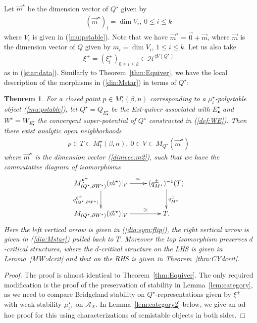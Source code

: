 \documentclass[11pt]{amsart}
\theoremstyle{plain}
\newtheorem{thm}{Theorem}[section]
\theoremstyle{definition}
\theoremstyle{remark}
\newcommand{\aA}{\mathcal{A}}
\newcommand{\hH}{\mathcal{H}}
\begin{document}
Let $\vec{m}^{\star}$ be the dimension vector of $Q^{\star}$ given by
\begin{align}\label{dimvec:m2}
(\vec{m}^{\star})_i=\dim V_i, \ 
0 \le i\le k
\end{align}
where $V_i$ is given in (\ref{mu:pstable}). 
Note that we have $\vec{m}^{\star}=\vec{0}+\vec{m}$, where 
$\vec{m}$ is the dimension vector of $Q$
given by $m_i=\dim V_i$, $1\le i\le k$. 
Let us also 
take 
\begin{align*}
\xi^{\pm} =(\xi_i^{\pm})_{0 \le i\le k}
\in \hH^{\sharp V(Q^{\star})}
\end{align*}
 as in (\ref{star:data}). 
Similarly to Theorem~\ref{thm:Equiver}, we have the local 
description of the morphisms in (\ref{dia:Mstar})
in terms of $Q^{\star}$:

\begin{thm}\label{thm:Equiver2}
For a closed point 
$p\in M_{t}^{\star}(\beta, n)$ corresponding to a 
$\mu_t^{\star}$-polystable 
object (\ref{mu:pstable}),
let $Q^{\star}=Q_{E_{\bullet}^{\star}}$ be the 
Ext-quiver
associated with $E_{\bullet}^{\star}$ 
and $W^{\star}=W_{E_{\bullet}^{\star}}$ the 
convergent super-potential of $Q^{\star}$ constructed in (\ref{def:WE}). 
Then there exist
 analytic 
open neighborhoods 
\begin{align*}
p \in T \subset M_{t}^{\star}(\beta, n), \ 
0 \in V \subset M_{Q^{\star}}(\vec{m}^{\star})
\end{align*}
where $\vec{m}^{\star}$ is the dimension vector (\ref{dimvec:m2}), 
such that we have the commutative diagram of isomorphisms 
\begin{align}\label{isom:weak}
\xymatrix{
M^{\xi^{\pm}}_{(Q^{\star}, \partial W^{\star})}(\vec{m}^{\star})|_{V} \ar[r]^-{\cong} 
\ar[d]_-{q_{(Q^{\star}, \partial W^{\star})}^{\xi^{\pm}}} &
(q_{M^{\star}}^{\pm})^{-1}(T) \ar[d]^-{q_{M^{\star}}^{\pm}} \\
M_{(Q^{\star}, \partial W^{\star})}(\vec{m}^{\star})|_{V} \ar[r]^-{\cong} & T. 
}
\end{align}
Here the left vertical arrow is given in (\ref{dia:sym:flip}), 
the right vertical arrow is given 
in (\ref{dia:Mstar}) pulled back to
$T$. 
Moreover the top isomorphism 
preserves $d$-critical structures, where 
the $d$-critical structure on the LHS is given in Lemma~\ref{MW:dcrit}
and that on the RHS is given in Theorem~\ref{thm:CYdcrit}. 
\end{thm}
\begin{proof}
The proof is almost identical to Theorem~\ref{thm:Equiver}.
The only required modification is 
the proof of the preservation of 
stability in Lemma~\ref{lem:category}, 
as we need to compare Bridgeland stability 
on $Q^{\star}$-representations given by $\xi^{\pm}$
with weak 
stability $\mu_{t^{\pm}}^{\star}$ on $\aA_X$. 
In Lemma~\ref{lem:category2} below, we
 give an ad-hoc proof for this using 
characterizations of semistable objects in both sides. 
\end{proof}
\end{document}

